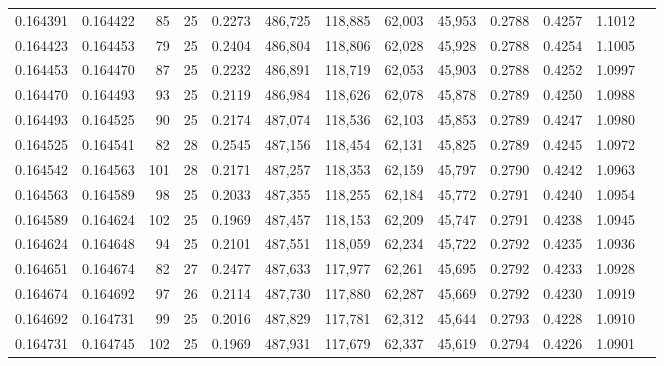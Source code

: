 \begin{tabular}{rrrrrrrrrrrrr}
0.164391 & 0.164422 &  85 &  25 &                                     0.2273 & 486,725 & 118,885 &  62,003 &  45,953 & 0.2788 & 0.4257 & 1.1012 \\
0.164423 & 0.164453 &  79 &  25 &                                     0.2404 & 486,804 & 118,806 &  62,028 &  45,928 & 0.2788 & 0.4254 & 1.1005 \\
0.164453 & 0.164470 &  87 &  25 &                                     0.2232 & 486,891 & 118,719 &  62,053 &  45,903 & 0.2788 & 0.4252 & 1.0997 \\
0.164470 & 0.164493 &  93 &  25 &                                     0.2119 & 486,984 & 118,626 &  62,078 &  45,878 & 0.2789 & 0.4250 & 1.0988 \\
0.164493 & 0.164525 &  90 &  25 &                                     0.2174 & 487,074 & 118,536 &  62,103 &  45,853 & 0.2789 & 0.4247 & 1.0980 \\
0.164525 & 0.164541 &  82 &  28 &                                     0.2545 & 487,156 & 118,454 &  62,131 &  45,825 & 0.2789 & 0.4245 & 1.0972 \\
0.164542 & 0.164563 & 101 &  28 &                                     0.2171 & 487,257 & 118,353 &  62,159 &  45,797 & 0.2790 & 0.4242 & 1.0963 \\
0.164563 & 0.164589 &  98 &  25 &                                     0.2033 & 487,355 & 118,255 &  62,184 &  45,772 & 0.2791 & 0.4240 & 1.0954 \\
0.164589 & 0.164624 & 102 &  25 &                                     0.1969 & 487,457 & 118,153 &  62,209 &  45,747 & 0.2791 & 0.4238 & 1.0945 \\
0.164624 & 0.164648 &  94 &  25 &                                     0.2101 & 487,551 & 118,059 &  62,234 &  45,722 & 0.2792 & 0.4235 & 1.0936 \\
0.164651 & 0.164674 &  82 &  27 &                                     0.2477 & 487,633 & 117,977 &  62,261 &  45,695 & 0.2792 & 0.4233 & 1.0928 \\
0.164674 & 0.164692 &  97 &  26 &                                     0.2114 & 487,730 & 117,880 &  62,287 &  45,669 & 0.2792 & 0.4230 & 1.0919 \\
0.164692 & 0.164731 &  99 &  25 &                                     0.2016 & 487,829 & 117,781 &  62,312 &  45,644 & 0.2793 & 0.4228 & 1.0910 \\
0.164731 & 0.164745 & 102 &  25 &                                     0.1969 & 487,931 & 117,679 &  62,337 &  45,619 & 0.2794 & 0.4226 & 1.0901 \\

\end{tabular}
